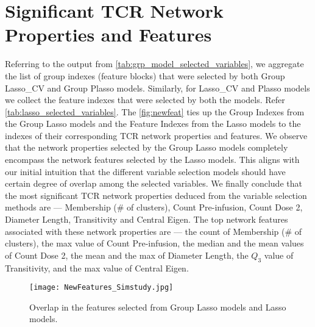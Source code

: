 \section{Significant TCR Network Properties and Features} \label{sec:add_features}
Referring to the output from \autoref{tab:grp_model_selected_variables}, we aggregate the list of group indexes (feature blocks) that were selected by both Group Lasso\_CV and Group Plasso models. Similarly, for  Lasso\_CV and Plasso models we collect the feature indexes that were selected by both the models. Refer \autoref{tab:lasso_selected_variables}. The \autoref{fig:newfeat} ties up the Group Indexes from the Group Lasso models and the Feature Indexes from the Lasso models to the indexes of their corresponding TCR network properties and features. We observe that the network properties selected by the Group Lasso models completely encompass the network features selected by the Lasso models. This aligns with our initial intuition that the different variable selection models should have certain degree of overlap among the selected variables. We finally conclude that the most significant TCR network properties deduced from the variable selection methods are --- Membership (\# of clusters), Count Pre-infusion, Count Dose 2, Diameter Length, Transitivity and Central Eigen. The top network features associated with these network properties are --- the count of Membership (\# of clusters), the max value of Count Pre-infusion,  the median and the mean values of Count Dose 2, the mean and the max of Diameter Length, the $Q_3$ value of Transitivity, and the max value of Central Eigen.\par

\begin{figure}[H]
\centering
\texttt{[image: NewFeatures\_Simstudy.jpg]}
\caption{Overlap in the features selected from Group Lasso models and Lasso models.}
\label{fig:newfeat}
\end{figure}